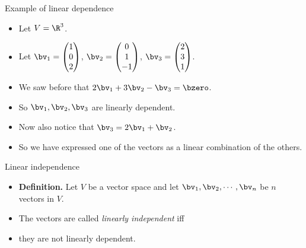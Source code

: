 \documentclass{beamer}
\begin{document}
\begin{frame}{Example of linear dependence}

\begin{itemize}
\item Let $V = \R^3$.
\item Let $\bv_1 =
\begin{pmatrix}
1 \\ 0 \\ 2
\end{pmatrix}
$,
$\bv_2 =
\begin{pmatrix}
0 \\ 1 \\ -1
\end{pmatrix}
$,
$\bv_3 =
\begin{pmatrix}
2 \\ 3 \\ 1
\end{pmatrix}
$.

\item We saw before that $2\bv_1+3\bv_2 - \bv_3 = \bzero$.
\item So $\bv_1, \bv_2, \bv_3$ are linearly dependent.
\item Now also notice that $\bv_3 = 2\bv_1 + \bv_2$.
\item So we have expressed one of the vectors as a linear combination of the others.
\end{itemize}

\end{frame}


\begin{frame}{Linear independence}

\begin{itemize}
\item \textbf{Definition.} Let $V$ be a vector space and let $\bv_1,\bv_2,\cdots,\bv_n$ be $n$ vectors in $V$.
\item The vectors are called \emph{linearly independent} iff
\item they are not linearly dependent.
\end{itemize}

\end{frame}
\end{document}
